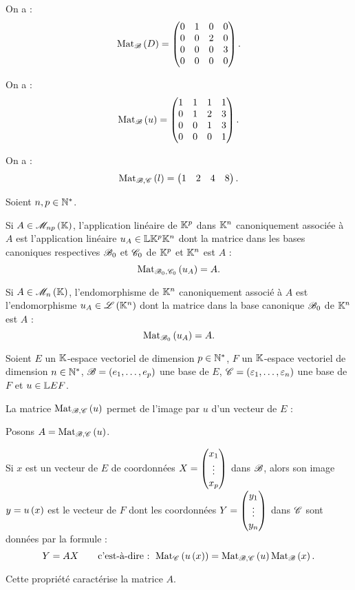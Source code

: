 \begin{corr}[1]
On a : \[\Mat{D}=\begin{pmatrix}
0 & 1 & 0 & 0 \\
0 & 0 & 2 & 0 \\
0 & 0 & 0 & 3 \\
0 & 0 & 0 & 0
\end{pmatrix}.\]
\end{corr}

\begin{corr}[2]
On a : \[\Mat{u}=\begin{pmatrix}
1 & 1 & 1 & 1 \\
0 & 1 & 2 & 3 \\
0 & 0 & 1 & 3 \\
0 & 0 & 0 & 1
\end{pmatrix}.\]
\end{corr}

\begin{corr}[3]
On a : \[\Mat[\fami{B},\fami{C}]{l}=\begin{pmatrix}1 & 2 & 4 & 8\end{pmatrix}.\]
\end{corr}

\begin{rem}
Soient \(n,p\in\mathbb{N}^*\).

Si \(A\in\M{np}\), l'application linéaire de \(\mathbb{K}^p\) dans \(\mathbb{K}^n\) canoniquement associée à \(A\) est l'application linéaire \(u_A\in\mathbb{L}{\mathbb{K}^p}{\mathbb{K}^n}\) dont la matrice dans les bases canoniques respectives \(\mathscr{B}_0\) et \(\mathscr{C}_0\) de \(\mathbb{K}^p\) et \(\mathbb{K}^n\) est \(A\) : \[\Mat[\fami{B}_0,\fami{C}_0]{u_A}=A.\]

Si \(A\in\M{n}\), l'endomorphisme de \(\mathbb{K}^n\) canoniquement associé à \(A\) est l'endomorphisme \(u_A\in\mathscr{L}\left(\mathbb{K}^n\right)\) dont la matrice dans la base canonique \(\mathscr{B}_0\) de \(\mathbb{K}^n\) est \(A\) : \[\Mat[\fami{B}_0]{u_A}=A.\]
\end{rem}

\begin{prop}
Soient \(E\) un \(\mathbb{K}\)-espace vectoriel de dimension \(p\in\mathbb{N}^*\), \(F\) un \(\mathbb{K}\)-espace vectoriel de dimension \(n\in\mathbb{N}^*\), \(\mathscr{B}=\left(e_1,\dots,e_p\right)\) une base de \(E\), \(\mathscr{C}=\left(\varepsilon_1,\dots,\varepsilon_n\right)\) une base de \(F\) et \(u\in\mathbb{L}{E}{F}\).

La matrice \(\Mat[\fami{B},\fami{C}]{u}\) permet de  l'image par \(u\) d'un vecteur de \(E\) :

Posons \(A=\Mat[\fami{B},\fami{C}]{u}\).

Si \(x\) est un vecteur de \(E\) de coordonnées \(X=\begin{pmatrix}x_1\\\vdots\\x_p\end{pmatrix}\) dans \(\mathscr{B}\), alors son image \(y=u\left(x\right)\) est le vecteur de \(F\) dont les coordonnées \(Y=\begin{pmatrix}y_1\\\vdots\\y_n\end{pmatrix}\) dans \(\mathscr{C}\) sont données par la formule : \[Y=AX\qquad\text{\cad : }\Mat[\fami{C}]{u\paren{x}}=\Mat[\fami{B},\fami{C}]{u}\Mat{x}.\]

Cette propriété caractérise la matrice \(A\).
\end{prop}

